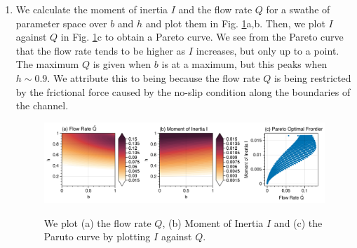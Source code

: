 \begin{enumerate}[label=(\roman*),leftmargin=*,itemsep=0mm]
    \item We calculate the moment of inertia $I$ and the flow rate $Q$ for a swathe of parameter space over $b$ and $h$ and plot them in Fig. \ref{prj1_qn1g}a,b.  Then, we plot $I$ against $Q$ in Fig. \ref{prj1_qn1g}c to obtain a Pareto curve. We see from the Pareto curve that the flow rate tends to be higher as $I$ increases, but only up to a point.  The maximum $Q$ is given when $b$ is at a maximum, but this peaks when $h \sim 0.9$.  We attribute this to being because the flow rate $Q$ is being restricted by the frictional force caused by the no-slip condition along the boundaries of the channel. 

    \begin{figure}[h!]
    \centering
    \includegraphics[width=\textwidth]{figures/prj1_qn1g.png}\\
    \caption{We plot (a) the flow rate $Q$, (b) Moment of Inertia $I$ and (c) the Paruto curve by plotting $I$ against $Q$.}
    \label{prj1_qn1g}
    \end{figure}
    
\end{enumerate}